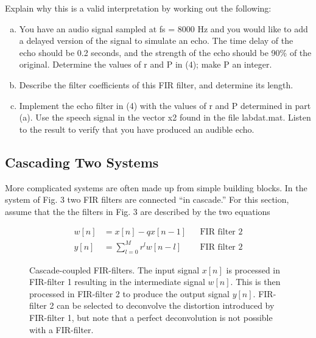 Explain why this is a valid interpretation by working out the following:
\begin{enumerate}[a)]
\item You have an audio signal sampled at fs = 8000 Hz and you would like to add a delayed version of 	the signal to simulate an echo. 
	The time delay of the echo should be 0.2 seconds, and the strength of the echo should be 90\% of the original. Determine the values of r and P in (4); make P an integer.
	
\item Describe the filter coefficients of this FIR filter, and determine its length.

\item Implement the echo filter in (4) with the values of r and P determined in part (a). Use the speech
	signal in the vector x2 found in the file labdat.mat. Listen to the result to verify that you have
	produced an audible echo.
	
\end{enumerate}

\subsection{Cascading Two Systems}
More complicated systems are often made up from simple building blocks. In the system of Fig. 3 two FIR
filters are connected “in cascade.” For this section, assume that the the filters in Fig. 3 are described by the
two equations

\begin{subequations}
\begin{align}
	w[n] &= x[n] - q x[n-1] & &\text{FIR filter 2} \\
	y[n] &=	\sum_{l=0}^M r^l w[n-l]	& &\text{FIR filter 2} 
\end{align}
\end{subequations}

\begin{figure}[!h]	
	\begin{center}
		
		\caption{Cascade-coupled FIR-filters.
		The input signal $x[n]$ is processed in FIR-filter 1 resulting in the intermediate signal $w[n]$. This is then processed in FIR-filter 2 to produce the output signal $y[n]$.
		FIR-filter 2  can be selected to deconvolve the distortion introduced by FIR-filter 1, but note that a perfect deconvolution is not possible with a FIR-filter.
		 }
		\label{fig:-cascaded-fir}
	\end{center}
\end{figure}

